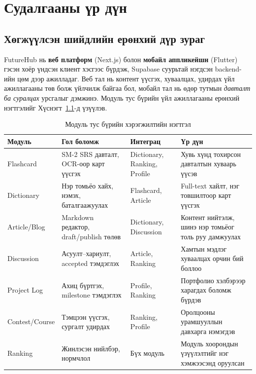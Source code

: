 \chapter{Судалгааны үр дүн}
\label{ch:results}


\section{Хөгжүүлсэн шийдлийн ерөнхий дүр зураг}

FutureHub нь \textbf{веб платформ} (Next.js) болон \textbf{мобайл аппликейшн} (Flutter) гэсэн хоёр үндсэн клиент хэсгээс бүрдэж, Supabase суурьтай нэгдсэн backend-ийн цөм дээр ажилладаг. Веб тал нь контент үүсгэх, хуваалцах, удирдах үйл ажиллагааны төв болж үйлчилж байгаа бол, мобайл тал нь өдөр тутмын \textit{давталт ба суралцах} урсгалыг дэмжинэ. Модуль тус бүрийн үйл ажиллагааны ерөнхий нэгтгэлийг Хүснэгт~\ref{tab:module-summary}-д үзүүлэв.

\par
\begin{table}[H]
\centering
\caption{Модуль тус бүрийн хэрэгжилтийн нэгтгэл}
\label{tab:module-summary}
\begin{tabular}{|p{3.2cm}|p{3.2cm}|p{3.2cm}|p{3.2cm}|}
\hline
\textbf{Модуль} & \textbf{Гол боломж} & \textbf{Интеграц} & \textbf{Үр дүн} \\ \hline
Flashcard        & SM-2 SRS давталт, OCR-оор карт үүсгэх & Dictionary, Ranking, Profile & Хувь хүнд тохирсон давталтын хуваарь үүсэв \\ \hline
Dictionary       & Нэр томьёо хайх, нэмэх, баталгаажуулах & Flashcard, Article & Full-text хайлт, нэг товшилтоор карт үүсгэх \\ \hline
Article/Blog     & Markdown редактор, draft/publish төлөв & Dictionary, Discussion & Контент нийтэлж, шинэ нэр томьёог толь руу дамжуулах \\ \hline
Discussion       & Асуулт--хариулт, accepted тэмдэглэх & Article, Ranking & Хамтын мэдлэг хуваалцах орчин бий боллоо \\ \hline
Project Log      & Ахиц бүртгэх, milestone тэмдэглэх & Profile, Ranking & Портфолио хэлбэрээр харагдах боломж бүрдэв \\ \hline
Contest/Course   & Тэмцээн үүсгэх, сургалт удирдах & Ranking, Profile & Оролцооны урамшууллын давхарга нэмэгдэв \\ \hline
Ranking          & Жинлэсэн нийлбэр, нормчлол & Бүх модуль & Модуль хоорондын үзүүлэлтийг нэг хэмжээсэнд оруулсан \\ \hline
\end{tabular}
\end{table}

